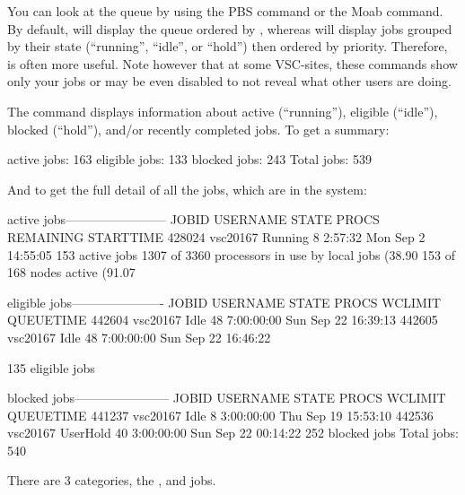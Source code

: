 \else  %
  You can look at
  the queue by using the PBS  command or the Moab
   command. By default,  will display the queue
  ordered by , whereas  will display jobs grouped by
  their state (``running'', ``idle'', or ``hold'') then ordered by priority.
  Therefore,  is often more useful.
  Note however that at some VSC-sites, these commands show only your jobs or may
  be even disabled to not reveal what other users are doing.

  The  command displays information about active (``running''),
  eligible (``idle''), blocked (``hold''), and/or recently completed jobs. To get
  a summary:

\begin{prompt}
active jobs: 163
eligible jobs: 133
blocked jobs: 243
Total jobs:  539
\end{prompt}

\fi %

\ifantwerpen
And to get the full detail of all the jobs, which are in the system:

\begin{prompt}
active jobs------------------------
JOBID     USERNAME  STATE PROCS REMAINING          STARTTIME
428024    vsc20167  Running   8   2:57:32  Mon Sep  2 14:55:05
153 active jobs 1307 of 3360 processors in use by local jobs (38.90%
153 of 168 nodes active      (91.07%

eligible jobs----------------------
JOBID     USERNAME  STATE PROCS   WCLIMIT            QUEUETIME
442604    vsc20167   Idle  48  7:00:00:00  Sun Sep 22 16:39:13
442605    vsc20167   Idle  48  7:00:00:00  Sun Sep 22 16:46:22

135 eligible jobs

blocked jobs-----------------------
JOBID   USERNAME     STATE PROCS WCLIMIT            QUEUETIME
441237  vsc20167      Idle   8 3:00:00:00 Thu Sep 19 15:53:10
442536  vsc20167  UserHold  40 3:00:00:00 Sun Sep 22 00:14:22
252 blocked jobs
Total jobs:  540
\end{prompt}
\fi  %

\ifbrussel
\else
  There are 3 categories, the ,  and  jobs.

